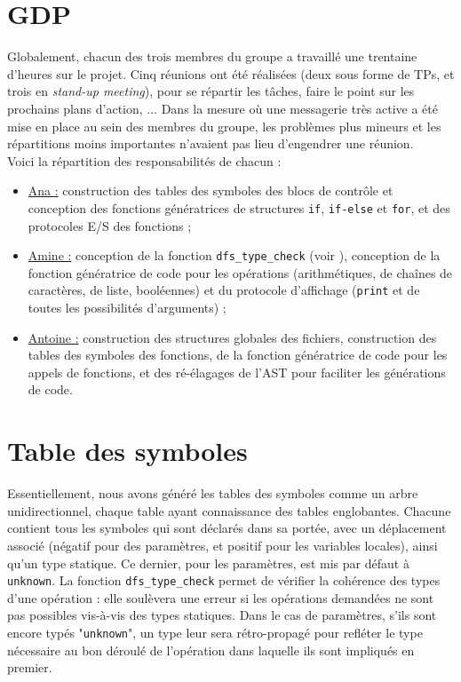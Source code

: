 \documentclass[a4paper, 12pt]{report}
\begin{document}
\section{GDP}

Globalement, chacun des trois membres du groupe a travaillé une trentaine d'heures sur le projet. Cinq réunions ont été réalisées (deux sous forme de TPs, et trois en \textit{stand-up meeting}), pour se répartir les tâches, faire le point sur les prochains plans d'action, ... Dans la mesure où une messagerie très active a été mise en place au sein des membres du groupe, les problèmes plus mineurs et les répartitions moins importantes n'avaient pas lieu d'engendrer une réunion.\\

Voici la répartition des responsabilités de chacun :
\begin{itemize}[label=$\bullet$]
\item \underline{Ana :} construction des tables des symboles des blocs de contrôle et conception des fonctions génératrices de structures \texttt{if}, \texttt{if-else} et \texttt{for}, et des protocoles E/S des fonctions ;
\item \underline{Amine :} conception de la fonction \texttt{dfs\_type\_check} (voir ), conception de la fonction génératrice de code pour les opérations (arithmétiques, de chaînes de caractères, de liste, booléennes) et du protocole d'affichage (\texttt{print} et de toutes les possibilités d'arguments) ; 
\item \underline{Antoine :} construction des structures globales des fichiers, construction des tables des symboles des fonctions, de la fonction génératrice de code pour les appels de fonctions, et des ré-élagages de l'AST pour faciliter les générations de code.\\
\end{itemize}

\section{Table des symboles}
\label{sec:tds}

Essentiellement, nous avons généré les tables des symboles comme un arbre unidirectionnel, chaque table ayant connaissance des tables englobantes. Chacune contient tous les symboles qui sont déclarés dans sa portée, avec un déplacement associé (négatif pour des paramètres, et positif pour les variables locales), ainsi qu'un type statique. Ce dernier, pour les paramètres, est mis par défaut à \texttt{unknown}. La fonction \texttt{dfs\_type\_check} permet de vérifier la cohérence des types d'une opération : elle soulèvera une erreur si les opérations demandées ne sont pas possibles vis-à-vis des types statiques. Dans le cas de paramètres, s'ils sont encore typés "\texttt{unknown}", un type leur sera rétro-propagé pour refléter le type nécessaire au bon déroulé de l'opération dans laquelle ils sont impliqués en premier.\\
\end{document}
